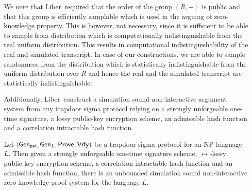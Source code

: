 \begin{remark}
We note that Liber~\etal required that the order of the group $(R,+)$ is public and that this group is efficiently samplable which is used in the arguing of zero-knowledge property. This is however, not necessary, since it is sufficient to be able to sample from distribution which is computationally indistinguishable from the real uniform distribution. This results in computational indistinguishability of the real and simulated transcript. In case of our constructions, we are able to sample randomness from the distribution which is statistically indistinguishable from the uniform distribution over $R$ and hence the real and the simulated transcript are statistically indistinguishable. 
\end{remark}

Additionally, Liber~\etal construct a simulation sound non-interactive argument system from any trapdoor sigma protocol relying on a strongly unforgeable one-time signature, a lossy public-key encryption scheme, an admissible hash function and a correlation intractable hash function. 

\begin{theorem}\label{thm:nizk}
Let $(\mathsf{Gen}_{\mathsf{par}}, \mathsf{Gen}_L, \mathsf{Prove}, \mathsf{Vrfy})$ be a trapdoor sigma protocol for an NP language $L$. Then given a strongly unforgeable one-time signature scheme, $\rel$-lossy public-key encryption scheme, a correlation intractable hash function and an admissible hash function, there is an unbounded simulation sound non-interactive zero-knowledge proof system for the language $L$. 
\end{theorem}

